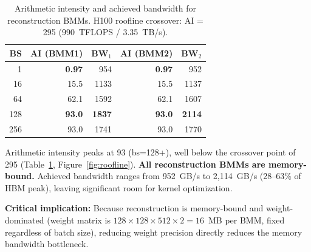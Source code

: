 \documentclass[10pt,twocolumn]{article}
\begin{document}
\begin{table}[h]
\centering
\small
\caption{Arithmetic intensity and achieved bandwidth for reconstruction BMMs.  H100 roofline crossover: AI = 295 (990~TFLOPS / 3.35~TB/s).}
\label{tab:roofline}
\begin{tabular}{@{}rrrrr@{}}
\toprule
BS & AI (BMM1) & BW$_1$ & AI (BMM2) & BW$_2$ \\
\midrule
  1 & \textbf{0.97} &  954 & \textbf{0.97} &  952 \\
 16 & 15.5 & 1133 & 15.5 & 1137 \\
 64 & 62.1 & 1592 & 62.1 & 1607 \\
128 & \textbf{93.0} & \textbf{1837} & \textbf{93.0} & \textbf{2114} \\
256 & 93.0 & 1741 & 93.0 & 1770 \\
\bottomrule
\end{tabular}
\end{table}

Arithmetic intensity peaks at 93 (bs=128+), well below the crossover point of 295 (Table~\ref{tab:roofline}, Figure~\ref{fig:roofline}).  \textbf{All reconstruction BMMs are memory-bound.}  Achieved bandwidth ranges from 952~GB/s to 2,114~GB/s (28--63\% of HBM peak), leaving significant room for kernel optimization.

\textbf{Critical implication:}  Because reconstruction is memory-bound and weight-dominated (weight matrix is $128 \times 128 \times 512 \times 2 = 16$~MB per BMM, fixed regardless of batch size), reducing weight precision directly reduces the memory bandwidth bottleneck.
\end{document}
